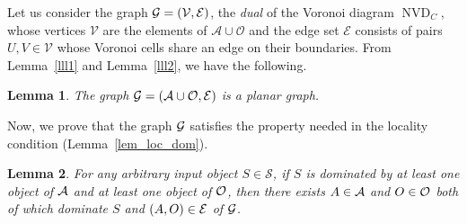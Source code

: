 \documentclass[a4paper,11pt]{article}
\DeclareMathOperator{\NVD}{NVD}
\newtheorem{lemma}{Lemma}
\begin{document}
Let us consider the graph  ${\cal G}=({\cal V},{\cal E})$,  the \emph{dual} of the Voronoi diagram $\NVD_C$, whose  
  vertices $\mathcal{V}$ are the elements of $\mathcal{A} \cup \mathcal{O}$ and the edge set $\mathcal{E}$ consists of pairs $U, V \in \mathcal{V}$ whose Voronoi cells share an edge on their boundaries.  
 From 
Lemma~\ref{lll1} and Lemma~\ref{lll2},  we have the following.

\begin{lemma}
 The graph ${\cal G}=({\cal A}\cup {\cal O}, {\cal E})$  is a planar graph.
\end{lemma}
 
Now,  we prove that the graph ${\cal G}$ satisfies the property needed in the locality condition (Lemma~\ref{lem_loc_dom}).

\begin{lemma}\label{loc4}
  For any arbitrary input object $S  \in  \mathscr{S}$, if $S$ is dominated by at least one object of $\cal A$ and at least one object of $\cal O$, then there exists $A\in {\cal A}$ and $O\in {\cal O}$ both of which dominate $S$ and  $(A,O)\in {\cal E}$ of ${\cal G}$.
 \end{lemma}
\end{document}
